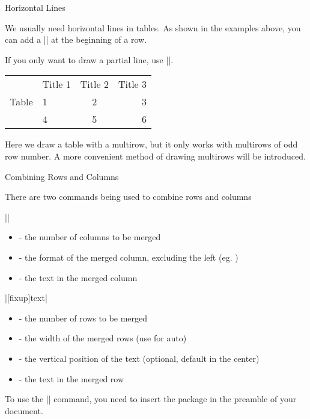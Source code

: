 \begin{frame}[fragile]{Horizontal Lines}

We usually need horizontal lines in tables. As shown in the examples above, you can add a \LC|\hline| at the beginning of a row. \medskip

If you only want to draw a partial line, use \LC||.

\begin{latexexamplesplit}
\begin{tabular}{c|l|c|r}
  \hline\hline
  & Title 1 & Title 2 & Title 3 \\
  \cline{2-4}
  Table & 1 & 2 & 3 \\
  \cline{2-4}
  & 4 & 5 & 6 \\
  \hline\hline
\end{tabular}
\end{latexexamplesplit}


Here we draw a table with a multirow, but it only works with multirows of odd row number. A more convenient method of drawing multirows will be introduced.

\end{frame}

\begin{frame}[fragile]{Combining Rows and Columns}

There are two commands being used to combine rows and columns
\begin{command}
\LC||

\begin{itemize}
	\item {} - the number of columns to be merged
	\item {} - the format of the merged column, excluding the left \packagename{|} (eg. )
	\item {} - the text in the merged column
\end{itemize}

\LC|[fixup]{text}|

\begin{itemize}
	\item {} - the number of rows to be merged
	\item {} - the width of the merged rows (use \packagename{*} for auto)
	\item {} - the vertical position of the text (optional, default in the center)
	\item {} - the text in the merged row
\end{itemize}	

\end{command}

To use the \LC|\multirow| command, you need to insert the package  in the preamble of your document.

\end{frame}



